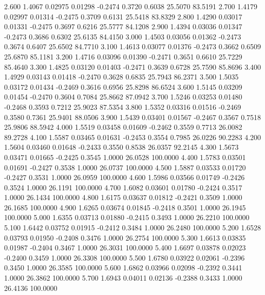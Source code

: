    2.600   1.4067   0.02975   0.01298  -0.2474   0.3720   0.6038  25.5070  83.5191
   2.700   1.4179   0.02997   0.01314  -0.2475   0.3709   0.6131  25.5418  83.8329
   2.800   1.4290   0.03017   0.01331  -0.2475   0.3697   0.6216  25.5777  84.1208
   2.900   1.4394   0.03036   0.01347  -0.2473   0.3686   0.6302  25.6135  84.4150
   3.000   1.4503   0.03056   0.01362  -0.2473   0.3674   0.6407  25.6502  84.7710
   3.100   1.4613   0.03077   0.01376  -0.2473   0.3662   0.6509  25.6870  85.1181
   3.200   1.4716   0.03096   0.01390  -0.2471   0.3651   0.6610  25.7229  85.4640
   3.300   1.4825   0.03120   0.01403  -0.2471   0.3639   0.6728  25.7590  85.8696
   3.400   1.4929   0.03143   0.01418  -0.2470   0.3628   0.6835  25.7943  86.2371
   3.500   1.5035   0.03172   0.01434  -0.2469   0.3616   0.6956  25.8298  86.6524
   3.600   1.5145   0.03209   0.01454  -0.2470   0.3604   0.7084  25.8662  87.0942
   3.700   1.5246   0.03253   0.01480  -0.2468   0.3593   0.7212  25.9023  87.5354
   3.800   1.5352   0.03316   0.01516  -0.2469   0.3580   0.7361  25.9401  88.0506
   3.900   1.5439   0.03401   0.01567  -0.2467   0.3567   0.7518  25.9806  88.5942
   4.000   1.5519   0.03458   0.01609  -0.2462   0.3559   0.7713  26.0082  89.2728
   4.100   1.5587   0.03465   0.01631  -0.2453   0.3554   0.7985  26.0226  90.2283
   4.200   1.5604   0.03460   0.01648  -0.2433   0.3550   0.8538  26.0357  92.2145
   4.300   1.5673   0.03471   0.01665  -0.2425   0.3545   1.0000  26.0528 100.0000
   4.400   1.5783   0.03501   0.01691  -0.2427   0.3538   1.0000  26.0737 100.0000
   4.500   1.5887   0.03533   0.01720  -0.2427   0.3531   1.0000  26.0959 100.0000
   4.600   1.5986   0.03566   0.01749  -0.2426   0.3524   1.0000  26.1191 100.0000
   4.700   1.6082   0.03601   0.01780  -0.2424   0.3517   1.0000  26.1434 100.0000
   4.800   1.6175   0.03637   0.01812  -0.2421   0.3509   1.0000  26.1685 100.0000
   4.900   1.6265   0.03674   0.01845  -0.2418   0.3501   1.0000  26.1945 100.0000
   5.000   1.6355   0.03713   0.01880  -0.2415   0.3493   1.0000  26.2210 100.0000
   5.100   1.6442   0.03752   0.01915  -0.2412   0.3484   1.0000  26.2480 100.0000
   5.200   1.6528   0.03793   0.01950  -0.2408   0.3476   1.0000  26.2754 100.0000
   5.300   1.6613   0.03835   0.01987  -0.2404   0.3467   1.0000  26.3031 100.0000
   5.400   1.6697   0.03878   0.02023  -0.2400   0.3459   1.0000  26.3308 100.0000
   5.500   1.6780   0.03922   0.02061  -0.2396   0.3450   1.0000  26.3585 100.0000
   5.600   1.6862   0.03966   0.02098  -0.2392   0.3441   1.0000  26.3862 100.0000
   5.700   1.6943   0.04011   0.02136  -0.2388   0.3433   1.0000  26.4136 100.0000
